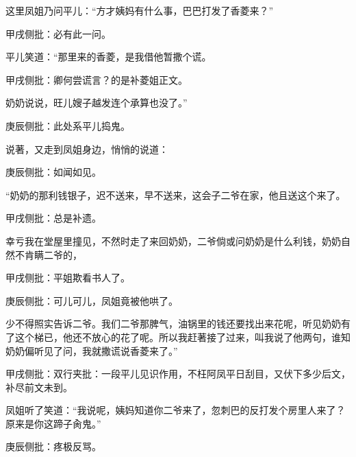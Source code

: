 \begin{parag}


    这里凤姐乃问平儿：“方才姨妈有什么事，巴巴打发了香菱来？”\begin{note}甲戌侧批：必有此一问。\end{note}平儿笑道：“那里来的香菱，是我借他暂撒个谎。\begin{note}甲戌侧批：卿何尝谎言？的是补菱姐正文。\end{note}奶奶说说，旺儿嫂子越发连个承算也没了。”\begin{note}庚辰侧批：此处系平儿捣鬼。\end{note}说著，又走到凤姐身边，悄悄的说道：\begin{note}庚辰侧批：如闻如见。\end{note}“奶奶的那利钱银子，迟不送来，早不送来，这会子二爷在家，他且送这个来了。\begin{note}甲戌侧批：总是补遗。\end{note}幸亏我在堂屋里撞见，不然时走了来回奶奶，二爷倘或问奶奶是什么利钱，奶奶自然不肯瞒二爷的，\begin{note}甲戌侧批：平姐欺看书人了。\end{note}\begin{note}庚辰侧批：可儿可儿，凤姐竟被他哄了。\end{note}少不得照实告诉二爷。我们二爷那脾气，油锅里的钱还要找出来花呢，听见奶奶有了这个梯已，他还不放心的花了呢。所以我赶著接了过来，叫我说了他两句，谁知奶奶偏听见了问，我就撒谎说香菱来了。”\begin{note}甲戌侧批：双行夹批：一段平儿见识作用，不枉阿凤平日刮目，又伏下多少后文，补尽前文未到。\end{note}凤姐听了笑道：“我说呢，姨妈知道你二爷来了，忽刺巴的反打发个房里人来了？原来是你这蹄子肏鬼。”\begin{note}庚辰侧批：疼极反骂。\end{note}
\end{parag}


